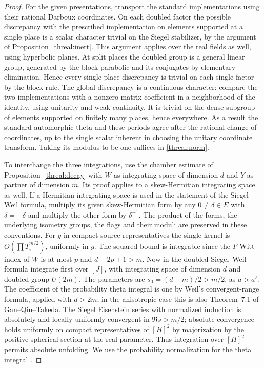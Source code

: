 \begin{proof}
For the given presentations, transport the standard implementations
using their rational Darboux coordinates. On each doubled factor the
possible discrepancy with the prescribed implementation on elements
supported at a single place is a scalar character trivial on the
Siegel stabilizer, by the argument of
Proposition~\ref{threal:inert}. This argument applies over the
real fields as well, using hyperbolic planes. At split places the
doubled group is a general linear group, generated by the block
parabolic and its conjugates by elementary elimination. Hence every
single-place discrepancy is trivial on each single factor by the
block rule. The global discrepancy is a continuous character:
compare the two implementations with a nonzero matrix coefficient
in a neighborhood of the identity, using unitarity and weak
continuity. It is trivial on the dense subgroup of elements supported
on finitely many places, hence everywhere. As a result the standard
automorphic theta and these periods agree after the rational change
of coordinates, up to the single scalar inherent in choosing the
unitary coordinate transform. Taking its modulus to be one suffices
in \eqref{threal:norm}.

To interchange the three integrations, use the chamber estimate of
Proposition~\ref{threal:decay} with \(W\) as integrating space of
dimension \(d\) and \(Y\) as partner of dimension \(m\). Its proof
applies to a skew-Hermitian integrating space as well. If a
Hermitian integrating space is used in the statement of the
Siegel--Weil formula, multiply its given skew-Hermitian form by
any \(0\ne\delta\in E\) with \(\bar\delta=-\delta\) and multiply
the other form by \(\delta^{-1}\). The product of the forms, the
underlying isometry groups, the flags and their moduli are preserved
in these conventions.
For \(g\) in compact source representatives the single kernel is
\(O(\prod T_i^{m/2})\), uniformly in \(g\). The squared bound is
integrable since the \(F\)-Witt index of \(W\) is at most \(p\)
and \(d-2p+1>m\). Now in the doubled Siegel--Weil formula integrate first over \([J]\),
with integrating space of dimension \(d\) and doubled group \(U(2m)\).
The parameters are \(s_0=(d-m)/2>m/2\), as \(a>a'\).
The coefficient of the probability theta integral is one by Weil's
convergent-range formula, applied with \(d>2m\); in the anisotropic
case this is also Theorem~7.1 of Gan--Qiu--Takeda. The Siegel Eisenstein
series with normalized induction is absolutely and locally uniformly
convergent in \(\Re s>m/2\); absolute convergence holds uniformly
on compact representatives of \([H]^2\) by majorization by the
positive spherical section at the real parameter. Thus integration
over \([H]^2\) permits absolute unfolding.
We use the probability normalization for the theta integral
\cite[introduction, Theorem~2 and \S3]{yamanaUnitary}.


\end{proof}
